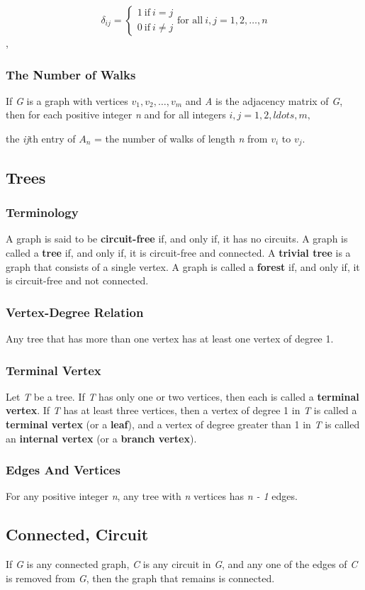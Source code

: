 \documentclass{article}
\begin{document}
\[
\delta _{ij} =
\begin{cases}
1 \ \text{if} \ i = j \\
0 \ \text{if} \ i \neq j
\end{cases}
\text{for all} \ i, j = 1, 2, \ldots, n
\],

\subsubsection{The Number of Walks}
If \textit{G} is a graph with vertices $v_1,v_2, \ldots, v_m$ and \textit{A} is the adjacency matrix of \textit{G}, then for each positive integer \textit{n} and for all integers $i, j = 1, 2, ldots , m,$

\begin{center}
the \textit{ij}th entry of $A_n$ = the number of walks of length \textit{n} from $v_i$ to $v_j$.
\end{center}

\setcounter{subsection}{4}
\subsection{Trees}
\subsubsection{Terminology}
A graph is said to be \textbf{circuit-free} if, and only if, it has no circuits. A graph is called a \textbf{tree} if, and only if, it is circuit-free and connected. A \textbf{trivial tree} is a graph that consists of a single vertex. A graph is called a \textbf{forest} if, and only if, it is circuit-free and not connected.

\subsubsection{Vertex-Degree Relation}
Any tree that has more than one vertex has at least one vertex of degree 1.

\subsubsection{Terminal Vertex}
Let \textit{T} be a tree. If \textit{T} has only one or two vertices, then each is called a \textbf{terminal vertex}. If \textit{T} has at least three vertices, then a vertex of degree 1 in \textit{T} is called a \textbf{terminal vertex} (or a \textbf{leaf}), and a vertex of degree greater than 1 in \textit{T} is called an \textbf{internal vertex} (or a \textbf{branch vertex}).

\subsubsection{Edges And Vertices}
For any positive integer \textit{n}, any tree with \textit{n} vertices has \textit{n - 1} edges.

\subsection{Connected, Circuit}
If \textit{G} is any connected graph, \textit{C} is any circuit in \textit{G}, and any one of the edges of \textit{C} is removed from \textit{G}, then the graph that remains is connected.
\end{document}
